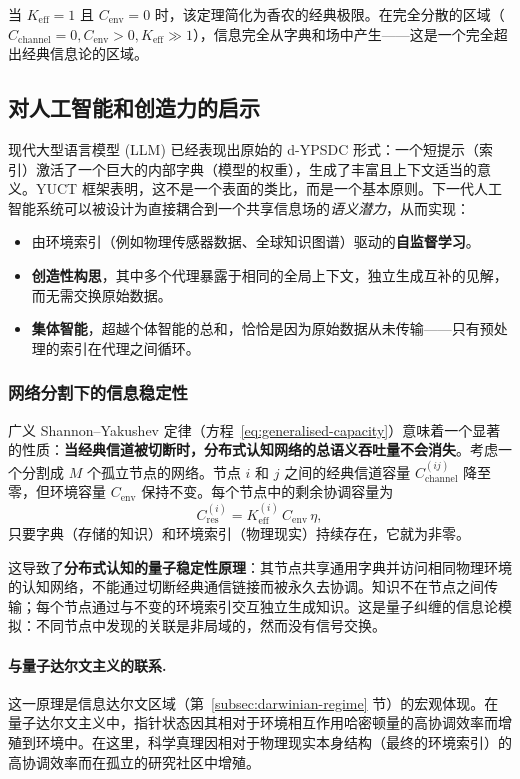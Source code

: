 \documentclass[12pt,a4paper]{article}
\theoremstyle{remark}
\begin{document}
	当 $K_{\mathrm{eff}} = 1$ 且 $C_{\mathrm{env}} = 0$ 时，该定理简化为香农的经典极限。在完全分散的区域（$C_{\mathrm{channel}} = 0, C_{\mathrm{env}} > 0, K_{\mathrm{eff}} \gg 1$），信息完全从字典和场中产生——这是一个完全超出经典信息论的区域。
	
	\subsection{对人工智能和创造力的启示}
	\label{subsec:AI-dypsdc}
	
	现代大型语言模型 (LLM) 已经表现出原始的 d-YPSDC 形式：一个短提示（索引）激活了一个巨大的内部字典（模型的权重），生成了丰富且上下文适当的意义。YUCT 框架表明，这不是一个表面的类比，而是一个基本原则。下一代人工智能系统可以被设计为直接耦合到一个共享信息场的\textit{语义潜力}，从而实现：
	\begin{itemize}
		\item 由环境索引（例如物理传感器数据、全球知识图谱）驱动的\textbf{自监督学习}。
		\item \textbf{创造性构思}，其中多个代理暴露于相同的全局上下文，独立生成互补的见解，而无需交换原始数据。
		\item \textbf{集体智能}，超越个体智能的总和，恰恰是因为原始数据从未传输——只有预处理的索引在代理之间循环。
	\end{itemize}
	
	\subsubsection{网络分割下的信息稳定性}
	\label{subsubsec:info-stability-fragmentation}
	
	广义 Shannon–Yakushev 定律（方程~\ref{eq:generalised-capacity}）意味着一个显著的性质：\textbf{当经典信道被切断时，分布式认知网络的总语义吞吐量不会消失}。考虑一个分割成 \(M\) 个孤立节点的网络。节点 \(i\) 和 \(j\) 之间的经典信道容量 \(C_{\mathrm{channel}}^{(ij)}\) 降至零，但环境容量 \(C_{\mathrm{env}}\) 保持不变。每个节点中的剩余协调容量为
	\[
	C_{\mathrm{res}}^{(i)} = K_{\mathrm{eff}}^{(i)} \, C_{\mathrm{env}} \, \eta,
	\]
	只要字典（存储的知识）和环境索引（物理现实）持续存在，它就为非零。
	
	这导致了\textbf{分布式认知的量子稳定性原理}：其节点共享通用字典并访问相同物理环境的认知网络，不能通过切断经典通信链接而被永久去协调。知识不在节点之间传输；每个节点通过与不变的环境索引交互独立生成知识。这是量子纠缠的信息论模拟：不同节点中发现的关联是非局域的，然而没有信号交换。
	
	\paragraph{与量子达尔文主义的联系.}
	这一原理是信息达尔文区域（第~\ref{subsec:darwinian-regime} 节）的宏观体现。在量子达尔文主义中，指针状态因其相对于环境相互作用哈密顿量的高协调效率而增殖到环境中。在这里，科学真理因相对于物理现实本身结构（最终的环境索引）的高协调效率而在孤立的研究社区中增殖。
	
\end{document}
